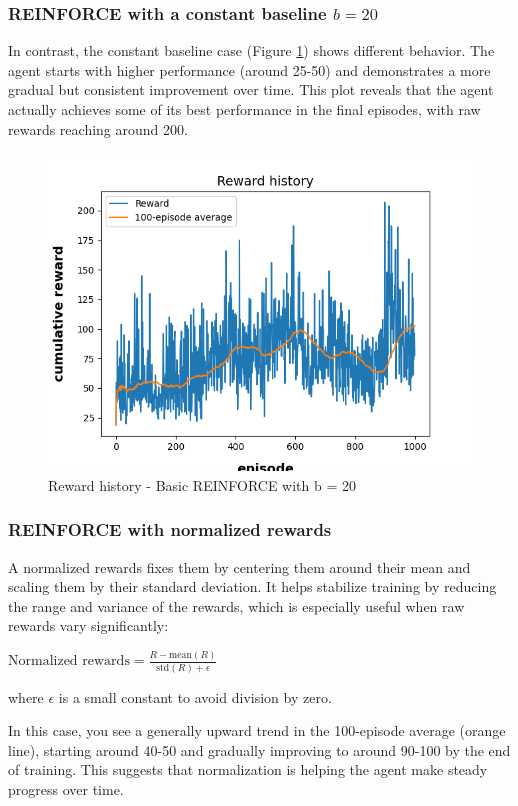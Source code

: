 \documentclass{article}
\begin{document}
\subsubsection{REINFORCE with a constant baseline $b = 20$}
In contrast, the constant baseline case (Figure \ref{fig:plot4}) shows different behavior.
The agent starts with higher performance (around 25-50) and demonstrates a more gradual but consistent improvement over time. This plot reveals that the agent actually achieves some of its best performance in the final episodes, with raw rewards reaching around 200.

\begin{figure}[h]
	\centering
	\includegraphics[width=0.5\linewidth]{../data/plot/reward_history_ContinuousCartPole-v0_0_constant_baseline.png}
	\caption{Reward history - Basic REINFORCE with b = 20}
	\label{fig:plot4}
\end{figure}

\newpage

\subsubsection{REINFORCE with normalized rewards}
A normalized rewards fixes them by centering them around their mean and scaling them by their standard deviation. It helps stabilize training by reducing the range and variance of the rewards, which is especially useful when raw rewards vary significantly:

\centering
$\text{Normalized rewards} = \frac{R - \text{mean}(R)}{\text{std}(R) + \epsilon}$

\flushleft

where  $\epsilon$  is a small constant to avoid division by zero.

In this case, you see a generally upward trend in the 100-episode average (orange line), starting around 40-50 and gradually improving to around 90-100 by the end of training. This suggests that normalization is helping the agent make steady progress over time.
\end{document}
